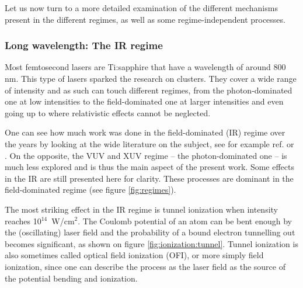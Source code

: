 Let us now turn to a more detailed examination of the different mechanisms
present in the different regimes, as well as some regime-independent processes.



\subsubsection{Long wavelength: The IR regime}
\label{section:intro:mechanisms:ir}

Most femtosecond lasers are Ti:sapphire that have a wavelength of around 800 nm.
This type of lasers sparked the research on clusters. They cover a wide range of
intensity and as such can touch different regimes, from the photon-dominated
one at low intensities to the field-dominated one at larger intensities and
even going up to where relativistic effects cannot be neglected.

One can see how much work was done in the field-dominated (IR) regime over the
years by looking at the wide literature on the subject, see for example ref.
\cite{Fennel2010} or \cite{Ramunno2008}. On the opposite, the VUV and XUV regime
-- the photon-dominated one -- is much less explored and is thus the main
aspect of the present work. Some effects in the IR are still presented here
for clarity. These processes are dominant in the field-dominated regime (see
figure \ref{fig:regimes}).



The most striking effect in the IR regime is tunnel
ionization\cite[Chapter~3]{Brabec2009} when intensity reaches 10$^{14}$~W/cm$^2$.
The Coulomb potential of an atom can be bent enough by the (oscillating) laser
field and the probability of a bound electron tunnelling out becomes significant,
as shown on figure \ref{fig:ionization:tunnel}. Tunnel ionization is also
sometimes called optical field ionization (OFI), or more simply field
ionization, since one can describe the process as the laser field as the source
of the potential bending and ionization.


